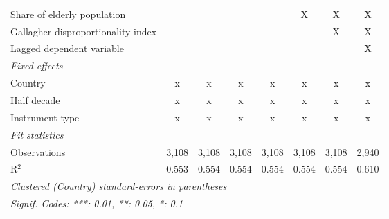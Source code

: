 \begin{tabular}{lccccccc}
   Share of elderly population                                               &              &              &              &              & X            & X            & X\\  
   Gallagher disproportionality index                                        &              &              &              &              &              & X            & X\\  
   Lagged dependent variable                                                 &              &              &              &              &              &              & X\\  
   \emph{Fixed effects}\\
   Country                                                                   & x            & x            & x            & x            & x            & x            & x\\  
   Half decade                                                               & x            & x            & x            & x            & x            & x            & x\\  
   Instrument type                                                           & x            & x            & x            & x            & x            & x            & x\\  
   \midrule \emph{Fit statistics}\\
   Observations                                                              & 3,108        & 3,108        & 3,108        & 3,108        & 3,108        & 3,108        & 2,940\\  
   R$^2$                                                                     & 0.553        & 0.554        & 0.554        & 0.554        & 0.554        & 0.554        & 0.610\\  
   \midrule
   \multicolumn{8}{l}{\emph{Clustered (Country) standard-errors in parentheses}}\\
   \multicolumn{8}{l}{\emph{Signif. Codes: ***: 0.01, **: 0.05, *: 0.1}}\\
\end{tabular}
\par\endgroup


